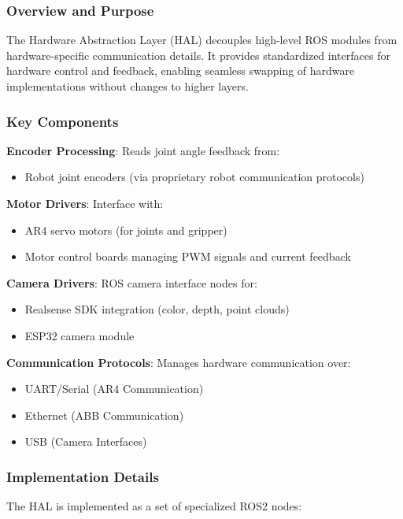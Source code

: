 \subsubsection{Overview and Purpose}
The Hardware Abstraction Layer (HAL) decouples high-level ROS modules from hardware-specific communication details. It provides standardized interfaces for hardware control and feedback, enabling seamless swapping of hardware implementations without changes to higher layers.

\subsubsection{Key Components}

\textbf{Encoder Processing}: Reads joint angle feedback from:
\begin{itemize}
    \item Robot joint encoders (via proprietary robot communication protocols)
\end{itemize}

\textbf{Motor Drivers}: Interface with:
\begin{itemize}
    \item AR4 servo motors (for joints and gripper)
    \item Motor control boards managing PWM signals and current feedback
\end{itemize}

\textbf{Camera Drivers}: ROS camera interface nodes for:
\begin{itemize}
    \item Realsense SDK integration (color, depth, point clouds)
    \item ESP32 camera module 
\end{itemize}

\textbf{Communication Protocols}: Manages hardware communication over:
\begin{itemize}
    \item UART/Serial (AR4 Communication)
    \item Ethernet (ABB Communication)
    \item USB (Camera Interfaces)
\end{itemize}

\subsubsection{Implementation Details}

The HAL is implemented as a set of specialized ROS2 nodes:

